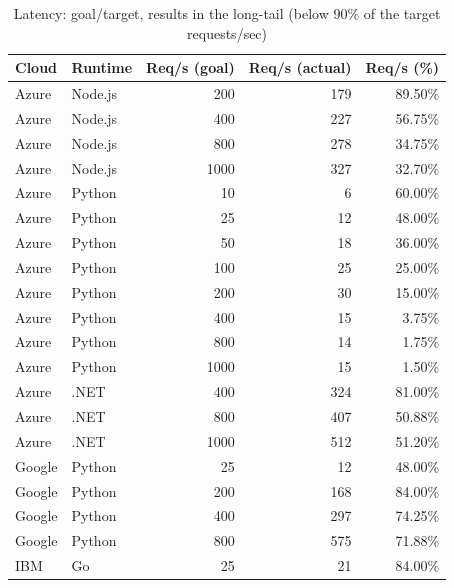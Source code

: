 \renewcommand{\arraystretch}{1.2}
\begin{table}[!t]
\setlength{\tabcolsep}{3pt}
\scriptsize
\centering
\caption{Latency: goal/target, results in the long-tail (below 90\% of the target requests/sec)}
\begin{tabular}{l|l|r|r|r} 
\rowcolor{gray!45}
\textbf{Cloud} & \textbf{Runtime} & \textbf{Req/s (goal)} & \textbf{Req/s (actual)} & \textbf{Req/s (\%)} \\ \hline
\rowcolor{gray!25}
Azure & Node.js & 200 & 179 & 89.50\% \\ 
Azure & Node.js & 400 & 227 & 56.75\% \\ 
Azure & Node.js & 800 & 278 & 34.75\% \\ 
Azure & Node.js & 1000 & 327 & 32.70\% \\
Azure & Python & 10 & 6 & 60.00\% \\  
Azure & Python & 25 & 12 & 48.00\% \\ 
Azure & Python & 50 & 18 & 36.00\% \\ 
Azure & Python & 100 & 25 & 25.00\% \\ 
Azure & Python & 200 & 30 & 15.00\% \\ 
Azure & Python & 400 & 15 & 3.75\% \\ 
Azure & Python & 800 & 14 & 1.75\% \\ 
Azure & Python & 1000 & 15 & 1.50\% \\
Azure & .NET & 400 & 324  & 81.00\% \\
Azure & .NET & 800 & 407 & 50.88\% \\ 
Azure & .NET & 1000 & 512 & 51.20\% \\ 
Google & Python & 25 & 12 & 48.00\% \\ 
Google & Python & 200 & 168 & 84.00\% \\ 
Google & Python & 400 & 297 & 74.25\% \\ 
Google & Python & 800 & 575 & 71.88\% \\ 
IBM & Go & 25 &  21 & 84.00\% \\ \hline
\end{tabular}
\label{table:rps}
\vspace{-15pt}
\end{table}


